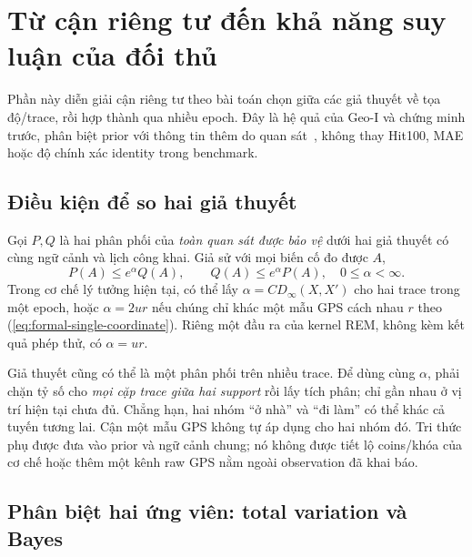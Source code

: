 \section{Từ cận riêng tư đến khả năng suy luận của đối thủ}
\label{sec:formal-inference}

Phần này diễn giải cận riêng tư theo bài toán chọn giữa các giả thuyết về
tọa độ/trace, rồi hợp thành qua nhiều epoch. Đây là hệ quả của Geo-I và
chứng minh trước, phân biệt prior với thông tin thêm do
quan sát~\cite{andres2013geoi,chatzikokolakis2014predictive}, không thay
Hit100, MAE hoặc độ chính xác identity trong benchmark.

\subsection{Điều kiện để so hai giả thuyết}
\label{sec:formal-inference-hypotheses}

Gọi $P,Q$ là hai phân phối của \emph{toàn quan sát được bảo vệ} dưới
hai giả thuyết có cùng ngữ cảnh và lịch công khai. Giả sử với mọi biến cố
đo được $A$,
\begin{equation}
 P(A)\leq e^\alpha Q(A),\qquad Q(A)\leq e^\alpha P(A),
 \quad 0\leq\alpha<\infty.
 \label{eq:formal-inference-likelihood}
\end{equation}
Trong cơ chế lý tưởng hiện tại, có thể lấy $\alpha=C D_\infty(X,X')$
cho hai trace trong một epoch, hoặc $\alpha=2ur$ nếu chúng chỉ khác một
mẫu GPS cách nhau $r$ theo (\ref{eq:formal-single-coordinate}). Riêng một
đầu ra của kernel REM, không kèm kết quả phép thử, có $\alpha=ur$.

Giả thuyết cũng có thể là một phân phối trên nhiều trace. Để dùng cùng
$\alpha$, phải chặn tỷ số cho \emph{mọi cặp trace giữa hai support} rồi
lấy tích phân; chỉ gần nhau ở vị trí hiện tại chưa đủ. Chẳng hạn, hai nhóm
``ở nhà'' và ``đi làm'' có thể khác cả tuyến tương lai. Cận một mẫu GPS
không tự áp dụng cho hai nhóm đó. Tri thức phụ được đưa vào prior và ngữ
cảnh chung; nó không được tiết lộ coins/khóa của cơ chế hoặc thêm một kênh
raw GPS nằm ngoài observation đã khai báo.

\subsection{Phân biệt hai ứng viên: total variation và Bayes}
\label{sec:formal-inference-binary}

